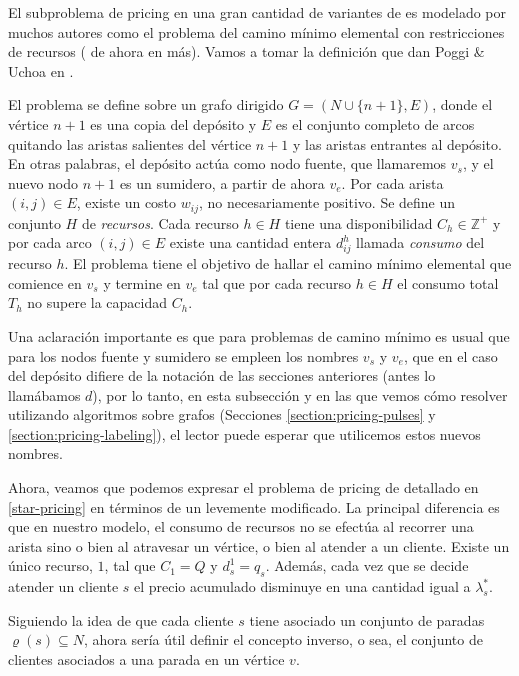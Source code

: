 El subproblema de pricing en una gran cantidad de variantes de  es modelado por muchos autores como el problema del camino mínimo elemental con restricciones de recursos ( de ahora en más). Vamos a tomar la definición que dan Poggi \& Uchoa en \cite{poggi-uchoa}. 

El problema se define sobre un grafo dirigido $G = (N \cup \{n+1\}, E)$, donde el vértice $n+1$ es una copia del depósito y $E$ es el conjunto completo de arcos quitando las aristas salientes del vértice $n+1$ y las aristas entrantes al depósito. En otras palabras, el depósito actúa como nodo fuente, que llamaremos $v_s$, y el nuevo nodo $n+1$ es un sumidero, a partir de ahora $v_e$. Por cada arista $(i, j) \in E$, existe un costo $w_{ij}$, no necesariamente positivo. Se define un conjunto $H$ de \emph{recursos}. Cada recurso $h \in H$ tiene una disponibilidad $C_h \in \mathbb{Z}^{+}$ y por cada arco $(i, j) \in E$ existe una cantidad entera $d_{ij}^{h}$ llamada \emph{consumo} del recurso $h$. El problema  tiene el objetivo de hallar el camino mínimo elemental que comience en $v_s$ y termine en $v_e$ tal que por cada recurso $h \in H$ el consumo total $T_h$ no supere la capacidad $C_h$. 

Una aclaración importante es que para problemas de camino mínimo es usual que para los nodos fuente y sumidero se empleen los nombres $v_s$ y $v_e$, que en el caso del depósito difiere de la notación de las secciones anteriores (antes lo llamábamos $d$), por lo tanto, en esta subsección y en las que vemos cómo resolver  utilizando algoritmos sobre grafos (Secciones \ref{section:pricing-pulses} y \ref{section:pricing-labeling}), el lector puede esperar que utilicemos estos nuevos nombres.

Ahora, veamos que podemos expresar el problema de pricing de  detallado en \ref{star-pricing} en términos de un  levemente modificado. La principal diferencia es que en nuestro modelo, el consumo de recursos no se efectúa al recorrer una arista sino o bien al atravesar un vértice, o bien al atender a un cliente. Existe un único recurso, $1$, tal que $C_1 = Q$ y $d_{s}^{1} = q_s$. Además, cada vez que se decide atender un cliente $s$ el precio acumulado disminuye en una cantidad igual a $\lambda^{*}_s$.

Siguiendo la idea de que cada cliente $s$ tiene asociado un conjunto de paradas $\varrho(s) \subseteq N$, ahora sería útil definir el concepto inverso, o sea, el conjunto de clientes asociados a una parada en un vértice $v$.

